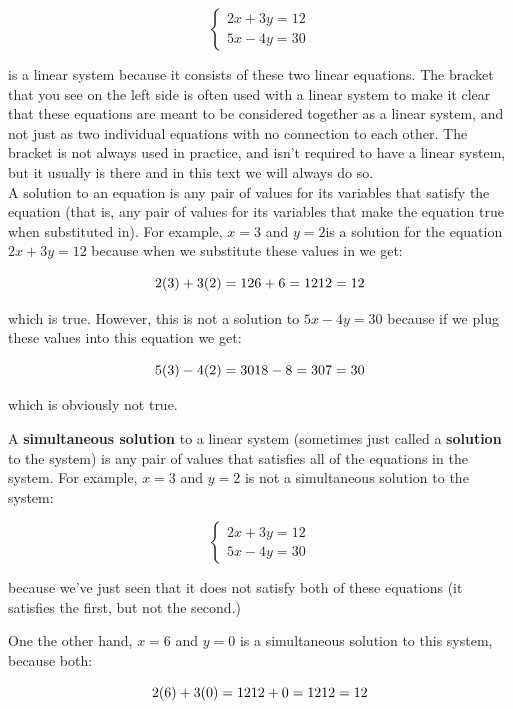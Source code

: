 $$\begin{cases}2x+3y=12\\5x-4y=30\end{cases}$$

is a linear system because it consists of these two linear equations. The bracket that you see on the left side is often used with a linear system to make it clear that these equations are meant to be considered together as a linear system, and not just as two individual equations with no connection to each other. The bracket is not always used in practice, and isn’t required to have a linear system, but it usually is there and in this text we will always do so. \\

A solution to an equation is any pair of values for its variables that satisfy the equation (that is, any pair of values for its variables that make the equation true when substituted in). For example, $x=3$ and $y=2$is a solution for the equation $2x+3y=12$ because when we substitute these values in we get:

$$2(3) + 3(2) = 12 \\ 6 + 6 = 12 \\ 12 = 12$$

which is true. However, this is not a solution to $5x-4y=30$ because if we plug these values into this equation we get:

$$5(3)-4(2)=30\\18-8=30\\7=30$$

which is obviously not true.

A \textbf{simultaneous solution} to a linear system (sometimes just called a \textbf{solution}  to the system) is any pair of values that satisfies all of the equations in the system. For example, $x=3$ and $y=2$ is not a simultaneous solution to the system:

$$\begin{cases}2x+3y=12\\5x-4y=30\end{cases}$$

because we’ve just seen that it does not satisfy both of these equations (it satisfies the first, but not the second.)

One the other hand, $x=6$ and $y=0$ is a simultaneous solution to this system, because both:

$$2(6) + 3(0) = 12\\12 + 0 = 12\\12 = 12$$

